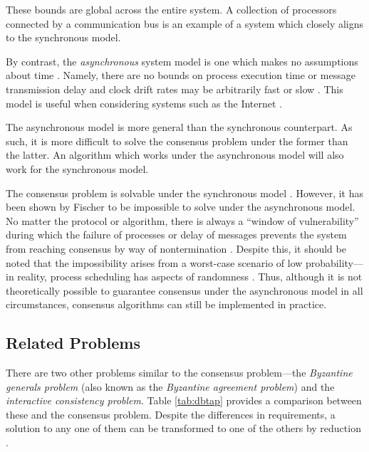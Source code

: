 \documentclass[12pt, a4paper]{article}
\begin{document}
These bounds are global across the entire system. A collection of processors
connected by a communication bus is an example of a system which closely aligns
to the synchronous model.

By contrast, the \textit{asynchronous} system model is one which makes no
assumptions about time \cite{coulouris2005distributed, hadzilacos1994modular}.
Namely, there are no bounds on process execution time or message transmission
delay and clock drift rates may be arbitrarily fast or slow
\cite{coulouris2005distributed}. This model is useful when considering systems
such as the Internet \cite{coulouris2005distributed}.

The asynchronous model is more general than the synchronous counterpart. As
such, it is more difficult to solve the consensus problem under the former than
the latter. An algorithm which works under the asynchronous model will also work
for the synchronous model.

The consensus problem is solvable under the synchronous model
\cite{fischer1985impossibility, kshemkalyani_singhal_2008}. However, it has been
shown by Fischer \cite{fischer1985impossibility} to be impossible to solve under
the asynchronous model. No matter the protocol or algorithm, there is always a
``window of vulnerability'' during which the failure of processes or delay of
messages prevents the system from reaching consensus by way of nontermination
\cite{fischer1985impossibility}. Despite this, it should be noted that the
impossibility arises from a worst-case scenario of low probability---in reality,
process scheduling has aspects of randomness \cite{aguilera2010stumbling}. Thus,
although it is not theoretically possible to guarantee consensus under the
asynchronous model in all circumstances, consensus algorithms can still be
implemented in practice.

\subsection{Related Problems} \label{sec:related-problems}
There are two other problems similar to the consensus problem---the
\textit{Byzantine generals problem} (also known as the \textit{Byzantine
agreement problem}) and the \textit{interactive consistency problem}. Table
\ref{tab:dbtap} provides a comparison between these and the consensus problem.
Despite the differences in requirements, a solution to any one of them can be
transformed to one of the others by reduction \cite{fischer1983consensus}.
\end{document}
